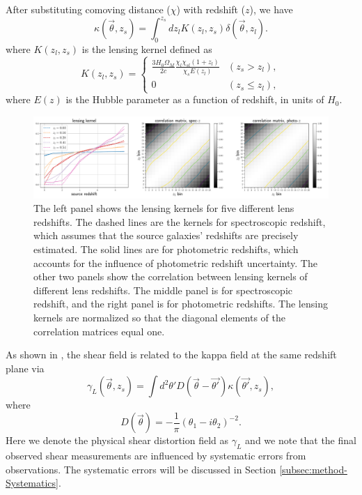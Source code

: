 \documentclass[twocolumn]{aastex62}
\begin{document}
After substituting comoving distance ($\chi$) with redshift ($z$), we have
\begin{equation}\label{eq-delta2kappa}
\kappa(\vec{\theta},z_s)=\int_0^{z_s} dz_l K(z_l,z_s)\delta(\vec{\theta},z_l).
\end{equation}
where $K(z_l,z_s)$ is the lensing kernel defined as
\begin{equation}
K(z_l,z_s) =
\begin{cases}
\frac{3H_0\Omega_M}{2 c} \frac{\chi_l \chi_{sl} (1+z_l)}{\chi_{s} E\left(z_l\right)} & (z_s>z_l),\\
0&(z_s \leq z_l),
\end{cases}
\end{equation}
where $E(z)$ is the Hubble parameter as a function of redshift, in units of $H_0$.

\begin{figure}[!t]
 \centering
 \includegraphics[width=1.\textwidth]{lensing_kernel.pdf}
 \caption{The left panel shows the lensing kernels for five different lens
         redshifts. The dashed lines are the kernels for spectroscopic redshift,
         which assumes that the source galaxies' redshifts are precisely
         estimated. The solid lines are for photometric redshifts, which
         accounts for the influence of photometric redshift uncertainty. The
         other two panels show the correlation between lensing kernels of
         different lens redshifts. The middle panel is for spectroscopic
         redshift, and the right panel is for photometric redshifts. The
         lensing kernels are normalized so that the diagonal elements of the
         correlation matrices equal one.
        }\label{fig_corlensKer}
\end{figure}

As shown in \citet{massMap-KS1993}, the shear field is related to the kappa
field at the same redshift plane via
\begin{equation}\label{eq-kappa2gamma}
\gamma_L(\vec{\theta},z_s) = \int  d^2 \theta' D(\vec{\theta}-\vec{\theta'}) \kappa(\vec{\theta'},z_s),
\end{equation}
where
\begin{equation}
D(\vec{\theta})=-\frac{1}{\pi}(\theta_1-i\theta_2)^{-2}.
\end{equation}
Here we denote the physical shear distortion field as $\gamma_L$ and we note
that the final observed shear measurements are influenced by systematic errors
from observations. The systematic errors will be discussed in Section
\ref{subsec:method-Systematics}.
\end{document}
